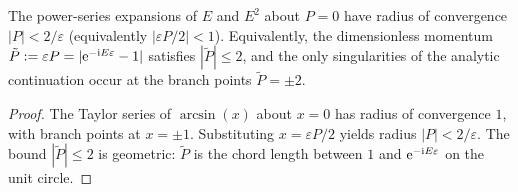 \begin{proposition}
\label{prop:dispersion_convergence_radius}
The power-series expansions of $E$ and $E^2$ about $P=0$ have radius of convergence $|P|<2/\varepsilon$ (equivalently $|\varepsilon P/2|<1$).
Equivalently, the dimensionless momentum $\tilde P:=\varepsilon P=|\mathrm{e}^{-\mathrm{i} E\varepsilon}-1|$ satisfies $|\tilde P|\le 2$, and the only singularities of the analytic continuation occur at the branch points $\tilde P=\pm 2$.
\end{proposition}

\begin{proof}
The Taylor series of $\arcsin(x)$ about $x=0$ has radius of convergence $1$, with branch points at $x=\pm 1$.
Substituting $x=\varepsilon P/2$ yields radius $|P|<2/\varepsilon$.
The bound $|\tilde P|\le 2$ is geometric: $\tilde P$ is the chord length between $1$ and $\mathrm{e}^{-\mathrm{i} E\varepsilon}$ on the unit circle.
\end{proof}

